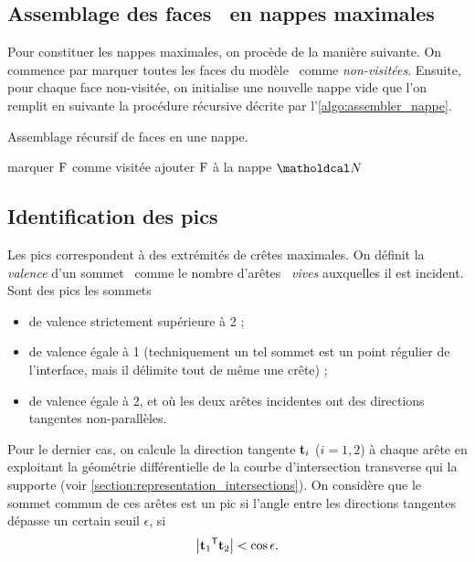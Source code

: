 \subsection{Assemblage des faces \brep\ en nappes maximales}
Pour constituer les nappes maximales, on procède de la manière suivante. 
On commence par marquer toutes les faces du modèle \brep\ comme \textit{non-visitées}. 
Ensuite, pour chaque face non-visitée, on initialise une nouvelle nappe vide que l'on remplit en suivante la procédure récursive décrite par l'\autoref{algo:assembler_nappe}.

\begin{algorithm}
	\caption{Assemblage récursif de faces en une nappe.}\label{algo:assembler_nappe}
	\begin{algorithmic}[1]
			\State marquer $\mathrm{F}$ comme visitée
			\State ajouter $\mathrm{F}$ à la nappe $\nappe$
						\State {}
					\EndIf
				\EndFor
			\EndFor
		\EndProcedure
	\end{algorithmic}
\end{algorithm}


\subsection{Identification des pics}
Les pics correspondent à des extrémités de crêtes maximales. 
On définit la \textit{valence} d'un sommet \brep\ comme le nombre d'arêtes \brep\ \textit{vives} auxquelles il est incident. 
Sont des pics les sommets
\begin{itemize}
	\item de valence strictement supérieure à 2 ;
	\item de valence égale à 1 (techniquement un tel sommet est un point régulier de l'interface, mais il délimite tout de même une crête) ;
	\item de valence égale à 2, et où les deux arêtes incidentes ont des directions tangentes non-parallèles.
\end{itemize}

Pour le dernier cas, on calcule la direction tangente $\mathbf{t}_i$ ($i = 1,2$) à chaque arête en exploitant la géométrie différentielle de la courbe d'intersection transverse qui la supporte (voir \autoref{section:representation_intersections}). 
On considère que le sommet commun de ces arêtes est un pic si l'angle entre les directions tangentes dépasse un certain seuil $\epsilon$, \ie si 
\begin{equation}
	\left| {\mathbf{t}_1} ^\mathsf{T} {\mathbf{t}_2} \right| < \cos \epsilon.
\end{equation}



